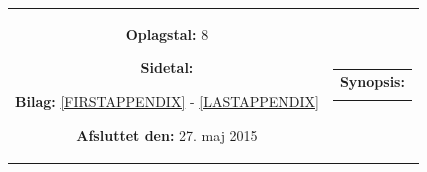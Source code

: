 \begin{titlepage}
\begin{nopagebreak}
{\begin{tabular}{cc}
{\begin{description}
						\item {\bf Oplagstal:} 8
						\item {\bf Sidetal:} \numpages
						\item {\bf Bilag:} \ref{FIRSTAPPENDIX} - \ref{LASTAPPENDIX}
						\item {\bf Afsluttet den:} 27. maj 2015
					\end{description}
					\vfill
				} &
				\parbox{7cm}{
					\vspace{.15cm}
					\hfill 
					\begin{tabular}{l}
						{\bf Synopsis:}\bigskip \\
						\fbox{
							\parbox{6.5cm}{\smallskip
								{\vfill{\small 
								\smallskip}}
							}
						}
  					\end{tabular}
  				}
			\end{tabular}
		}\\
		\\
	\end{nopagebreak}
\end{titlepage}